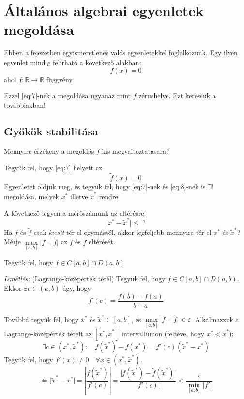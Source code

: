 \chapter{Általános algebrai egyenletek megoldása}

Ebben a fejezetben egyismeretlenes valós egyenletekkel foglalkozunk. Egy ilyen egyenlet mindig felírható a következő alakban:
\begin{equation}\label{eq:7}
    f(x) = 0
\end{equation}
ahol $f: \mathbb{R} \to \mathbb{R}$ függvény.

Ezzel \ref{eq:7}-nek a megoldása ugyanaz mint $f$ zérushelye. Ezt keressük a továbbiakban!

\section{Gyökök stabilitása}
\begin{kerdes}
    Mennyire érzékeny a megoldás $f$ kis megvaltoztatasara?
\end{kerdes}

Tegyük fel, hogy \ref{eq:7} helyett az 
\begin{equation}\label{eq:8}
    \tilde{f}(x) = 0
\end{equation}
Egyenletet oldjuk meg, és tegyük fel, hogy \ref{eq:7}-nek és \ref{eq:8}-nek is $\exists!$ megoldása, melyek $x^{*}$ illetve $\tilde{x}^{*}$ rendre.

A következő legyen a mérőszámunk az eltérésre:
\begin{equation*}
    \lvert x^{*} - \tilde{x}^{*} \rvert  \leq \; \text{?}
\end{equation*}
Ha $f$ és $\tilde{f}$ csak \textit{kicsit} tér el egymástól, akkor legfeljebb mennyire tér el $x^*$ és $\tilde{x}^*$?
Mérje $\max \limits_{[a, b]} \lvert f - \tilde{f} \rvert$ az $f$ és $\tilde{f}$ eltérését.

Tegyük fel, hogy $f \in C[a, b] \cap D(a, b)$ 

\textit{Ismétlés:} (Lagrange-középérték tétél)
Tegyük fel, hogy $f \in C[a, b] \cap D(a, b)$. Ekkor $\exists c \in (a, b)$ úgy, hogy
\begin{equation*}
    f'(c) = \frac{f(b) - f(a)}{b - a}
\end{equation*}

Továbbá tegyük fel, hogy $x^{*}$ és $\tilde{x}^{*} \in [a, b]$, és $\max \limits_{[a, b]} \lvert f - \tilde{f} \rvert < \varepsilon$.
Alkalmazzuk a Lagrange-középérték tételt az $[x^{*}, \tilde{x}^{*}]$ intervallumon (feltéve, hogy $x^{*} < \tilde{x}^{*}$):
\begin{equation*}
    \exists c \in (x^{*}, \tilde{x}^{*}): \quad f(\tilde{x}^{*}) - f(x^{*}) = f'(c)(\tilde{x}^{*} - x^{*})
\end{equation*}
Tegyük fel, hogy $f'(x) \neq 0 \quad \forall x \in (x^{*}, \tilde{x}^{*})$.
\begin{equation*}
    \iff \lvert \tilde{x}^{*} - x^{*} \rvert = \left\lvert  \frac{f(\tilde{x}^{*})}{f'(c)}  \right\rvert  = \frac{\lvert f(\tilde{x}^{*}) - \tilde{f}(\tilde{x}^{*}) \rvert}{\lvert f'(c) \rvert } < \frac{\varepsilon}{\min \limits_{[a, b]} \lvert f' \rvert  }
\end{equation*}

